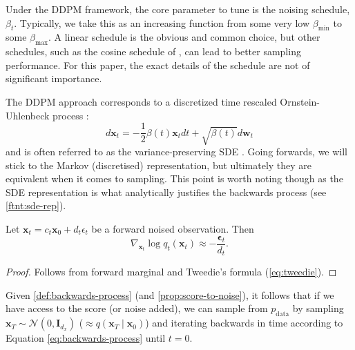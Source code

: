 \begin{remark}
    Under the DDPM framework, the core parameter to tune is the noising schedule, $\beta_t$.
    Typically, we take this as an increasing function from some very low $\beta_{\text{min}}$ to
    some $\beta_{\text{max}}$. A linear schedule is the obvious and common choice, but other
    schedules, such as the cosine schedule of \textcite{nicholImprovedDenoisingDiffusion2021}, can
    lead to better sampling performance. For this paper, the exact details of the schedule are not
    of significant importance.
\end{remark}

\begin{remark}
    The DDPM approach corresponds to a discretized time rescaled Ornstein-Uhlenbeck process
    \parencite{boysTweedieMomentProjected2023,songScoreBasedGenerativeModeling2021}:
    $$
    d\mathbf{x}_t = -\frac{1}{2}\beta(t)\mathbf{x}_t dt + \sqrt{\beta(t)}d\mathbf{w}_t
    $$
    and is often referred to as the variance-preserving SDE
    \parencite{songScoreBasedGenerativeModeling2021}. Going forwards, we will stick to the Markov
    (discretised) representation, but ultimately they are equivalent when it comes to sampling.
    This point is worth noting though as the SDE representation is what analytically justifies the
    backwards process (see \ref{ftnt:sde-rep}).
\end{remark}

\begin{proposition} \label{prop:score-to-noise}
    Let $\mathbf{x}_t = c_t\mathbf{x}_0 + d_t\epsilon_t$ be a forward noised observation. Then
    $$
    \nabla_{\mathbf{x}_t} \log q_t(\mathbf{x}_t) \approx -\frac{\mathbf{\epsilon}_t}{d_t}.
    $$
\end{proposition}
\begin{proof}
    Follows from forward marginal and Tweedie's formula (\ref{eq:tweedie}).
\end{proof}

Given \ref{def:backwards-process} (and \ref{prop:score-to-noise}), it follows that if we have
access to the score (or noise added), we can sample from $p_{\text{data}}$ by sampling
$\mathbf{x}_T \sim \mathcal{N}(0, \mathbf{I}_{d_x})$ ($\approx q(\mathbf{x}_T \mid \mathbf{x}_0)$)
and iterating backwards in time according to Equation \ref{eq:backwards-process} until $t=0$.

